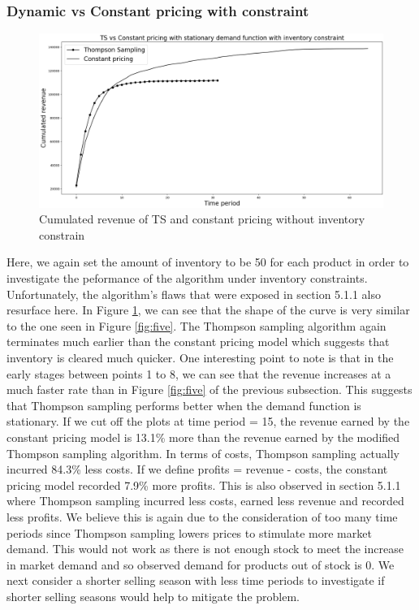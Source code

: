 \documentclass[a4paper]{article}
\begin{document}
\subsubsection{Dynamic vs Constant pricing with constraint}
\begin{figure}[h]
	\centering
	\includegraphics[width=1.03\textwidth]{3.png}
	\caption{\label{fig:3}Cumulated revenue of TS and constant pricing without inventory constrain}
\end{figure}
Here, we again set the amount of inventory to be 50 for each product in order to investigate the peformance of the algorithm under inventory constraints. Unfortunately, the algorithm's flaws that were exposed in section 5.1.1 also resurface here. In Figure \ref{fig:3}, we can see that the shape of the curve is very similar to the one seen in Figure \ref{fig:five}. The Thompson sampling algorithm again terminates much earlier than the constant pricing model which suggests that inventory is cleared much quicker. One interesting point to note is that in the early stages between points 1 to 8, we can see that the revenue increases at a much faster rate than in Figure \ref{fig:five} of the previous subsection. This suggests that Thompson sampling performs better when the demand function is stationary.
\newline
\newline
If we cut off the plots at time period = 15, the revenue earned by the constant pricing model is 13.1\% more than the revenue earned by the modified Thompson sampling algorithm. In terms of costs, Thompson sampling actually incurred 84.3\% less costs. If we define profits = revenue - costs, the constant pricing model recorded 7.9\% more profits. This is also observed in section 5.1.1 where Thompson sampling incurred less costs, earned less revenue and recorded less profits. We believe this is again due to the consideration of too many time periods since Thompson sampling lowers prices to stimulate more market demand. This would not work as there is not enough stock to meet the increase in market demand and so observed demand for products out of stock is 0. We next consider a shorter selling season with less time periods to investigate if shorter selling seasons would help to mitigate the problem.
\newpage
\end{document}
